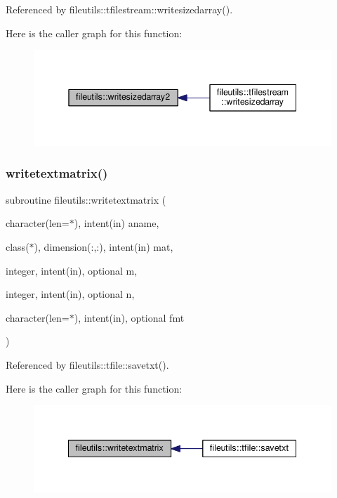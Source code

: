 Referenced by fileutils\+::tfilestream\+::writesizedarray().

Here is the caller graph for this function\+:
\nopagebreak
\begin{figure}[H]
\begin{center}
\leavevmode
\includegraphics[width=342pt]{namespacefileutils_aae72a2f6c28cf65ba7b21cd90f399eeb_icgraph}
\end{center}
\end{figure}
\mbox{\label{namespacefileutils_a9620c143afd6e00aa410fb9e0f5bad25}} 
\subsubsection{\texorpdfstring{writetextmatrix()}{writetextmatrix()}}
{\footnotesize\ttfamily subroutine fileutils\+::writetextmatrix (\begin{DoxyParamCaption}\item[{character(len=$\ast$), intent(in)}]{aname,  }\item[{class($\ast$), dimension(\+:,\+:), intent(in)}]{mat,  }\item[{integer, intent(in), optional}]{m,  }\item[{integer, intent(in), optional}]{n,  }\item[{character(len=$\ast$), intent(in), optional}]{fmt }\end{DoxyParamCaption})\hspace{0.3cm}{\ttfamily [private]}}



Referenced by fileutils\+::tfile\+::savetxt().

Here is the caller graph for this function\+:
\nopagebreak
\begin{figure}[H]
\begin{center}
\leavevmode
\includegraphics[width=342pt]{namespacefileutils_a9620c143afd6e00aa410fb9e0f5bad25_icgraph}
\end{center}
\end{figure}
\mbox{\label{namespacefileutils_abd621ad851fccd7a5f79146e2841c380}} 
